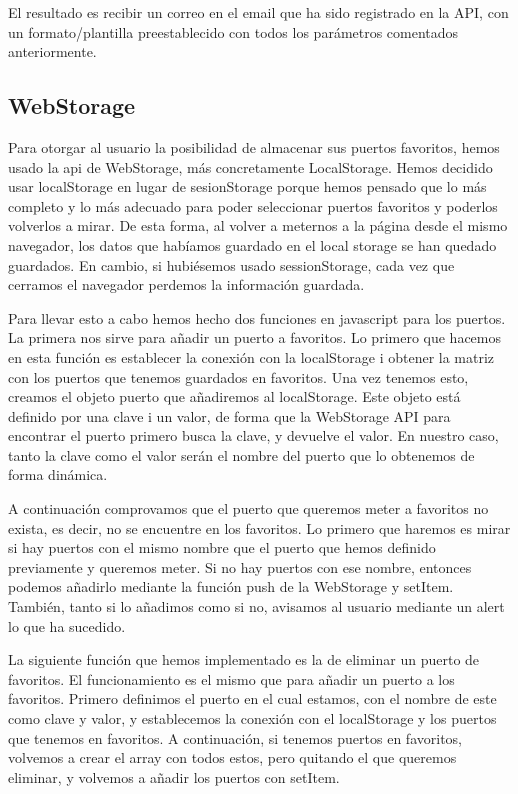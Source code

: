 \documentclass{article}
\begin{document}
    El resultado es recibir un correo en el email que ha sido registrado en la API, con un formato/plantilla preestablecido con todos los parámetros comentados anteriormente.

\subsection{WebStorage}
Para otorgar al usuario la posibilidad de almacenar sus puertos favoritos, hemos usado la api de WebStorage, más concretamente LocalStorage. Hemos decidido usar localStorage en lugar de sesionStorage porque hemos pensado que lo más 
completo y lo más adecuado para poder seleccionar puertos favoritos y poderlos volverlos a mirar. De esta forma, al volver a meternos a la página desde el mismo navegador, los datos que habíamos guardado en el local storage se han 
quedado guardados. En cambio, si hubiésemos usado sessionStorage, cada vez que cerramos el navegador perdemos la información guardada.

Para llevar esto a cabo hemos hecho dos funciones en javascript para los puertos. La primera nos sirve para añadir un puerto a favoritos. Lo primero que hacemos en esta función es establecer la conexión con la localStorage i obtener
la matriz con los puertos que tenemos guardados en favoritos. Una vez tenemos esto, creamos el objeto puerto que añadiremos al localStorage. Este objeto está definido por una clave i un valor, de forma que la WebStorage API para encontrar 
el puerto primero busca la clave, y devuelve el valor. En nuestro caso, tanto la clave como el valor serán el nombre del puerto que lo obtenemos de forma dinámica. 

A continuación comprovamos que el puerto que queremos meter a favoritos no exista, es decir, no se encuentre en los favoritos. Lo primero que haremos es mirar si hay puertos con el mismo nombre que el puerto que hemos definido previamente y queremos meter. Si no hay puertos con ese nombre, entonces podemos añadirlo mediante la función push de la WebStorage y setItem. También, tanto si lo añadimos como si no, avisamos al usuario mediante un alert lo que ha sucedido.

La siguiente función que hemos implementado es la de eliminar un puerto de favoritos. El funcionamiento es el mismo que para añadir un puerto a los favoritos. Primero definimos el puerto en el cual estamos, con el nombre de este como clave y valor, y establecemos la conexión con el localStorage y los puertos que tenemos en favoritos. A continuación, si tenemos puertos en favoritos, volvemos a crear el array con todos estos, pero quitando el que queremos eliminar, y volvemos a añadir los puertos con setItem.
\end{document}
